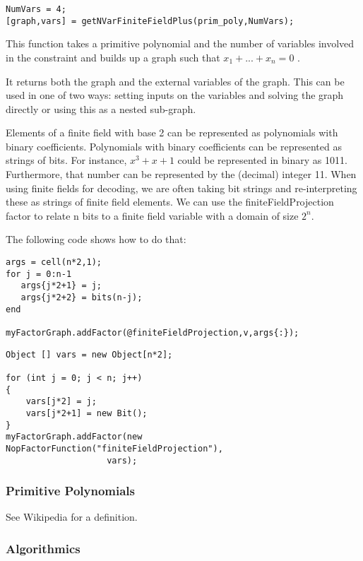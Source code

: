 \begin{lstlisting}
NumVars = 4;
[graph,vars] = getNVarFiniteFieldPlus(prim_poly,NumVars);
\end{lstlisting}

This function takes a primitive polynomial and the number of variables involved in the constraint and builds up a graph such that  $ x_1+...+x_n = 0 $ .

It returns both the graph and the external variables of the graph. This can be used in one of two ways: setting inputs on the variables and solving the graph directly or using this as a nested sub-graph.

\fi


Elements of a finite field with base 2 can be represented as polynomials with binary coefficients. Polynomials with binary coefficients can be represented as strings of bits. For instance, $x^3+x+1$ could be represented in binary as 1011. Furthermore, that number can be represented by the (decimal) integer 11. When using finite fields for decoding, we are often taking bit strings and re-interpreting these as strings of finite field elements. We can use the finiteFieldProjection factor to relate n bits to a finite field variable with a domain of size $2^n$.

The following code shows how to do that:

\ifmatlab
\begin{lstlisting}
args = cell(n*2,1);
for j = 0:n-1
   args{j*2+1} = j;
   args{j*2+2} = bits(n-j);
end

myFactorGraph.addFactor(@finiteFieldProjection,v,args{:});
\end{lstlisting}
\fi

\ifjava
\begin{lstlisting}
Object [] vars = new Object[n*2];
		
for (int j = 0; j < n; j++)
{
	vars[j*2] = j;
	vars[j*2+1] = new Bit();
}
myFactorGraph.addFactor(new NopFactorFunction("finiteFieldProjection"), 
					vars);

\end{lstlisting}
\fi

\subsubsection{Primitive Polynomials}

See Wikipedia for a definition. 

\subsubsection{Algorithmics}


